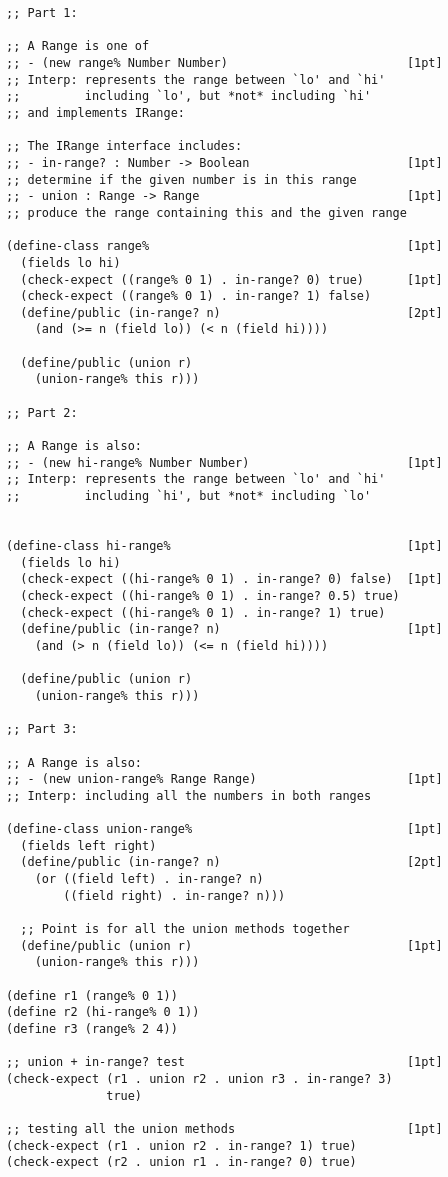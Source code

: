 \documentclass[12pt]{article}                   %
\newenvironment{solution}{}{}
\begin{document}
\begin{problem}
\begin{solution}
\begin{verbatim}
;; Part 1:

;; A Range is one of
;; - (new range% Number Number)                         [1pt]
;; Interp: represents the range between `lo' and `hi'
;;         including `lo', but *not* including `hi'
;; and implements IRange:

;; The IRange interface includes:
;; - in-range? : Number -> Boolean                      [1pt]
;; determine if the given number is in this range
;; - union : Range -> Range                             [1pt]
;; produce the range containing this and the given range

(define-class range%                                    [1pt]
  (fields lo hi)
  (check-expect ((range% 0 1) . in-range? 0) true)      [1pt]
  (check-expect ((range% 0 1) . in-range? 1) false)
  (define/public (in-range? n)                          [2pt]
    (and (>= n (field lo)) (< n (field hi))))
    
  (define/public (union r)
    (union-range% this r)))

;; Part 2:

;; A Range is also:
;; - (new hi-range% Number Number)                      [1pt]
;; Interp: represents the range between `lo' and `hi'
;;         including `hi', but *not* including `lo'


(define-class hi-range%                                 [1pt]
  (fields lo hi)
  (check-expect ((hi-range% 0 1) . in-range? 0) false)  [1pt]
  (check-expect ((hi-range% 0 1) . in-range? 0.5) true)
  (check-expect ((hi-range% 0 1) . in-range? 1) true)
  (define/public (in-range? n)                          [1pt]
    (and (> n (field lo)) (<= n (field hi))))
    
  (define/public (union r)
    (union-range% this r)))

;; Part 3:

;; A Range is also:
;; - (new union-range% Range Range)                     [1pt]
;; Interp: including all the numbers in both ranges

(define-class union-range%                              [1pt]
  (fields left right)
  (define/public (in-range? n)                          [2pt]
    (or ((field left) . in-range? n)
        ((field right) . in-range? n)))

  ;; Point is for all the union methods together
  (define/public (union r)                              [1pt]
    (union-range% this r)))

(define r1 (range% 0 1))
(define r2 (hi-range% 0 1))
(define r3 (range% 2 4))

;; union + in-range? test                               [1pt]
(check-expect (r1 . union r2 . union r3 . in-range? 3) 
              true)

;; testing all the union methods                        [1pt]
(check-expect (r1 . union r2 . in-range? 1) true)
(check-expect (r2 . union r1 . in-range? 0) true)
\end{verbatim}
\end{solution}
\end{problem}
\newpage
\end{document}
